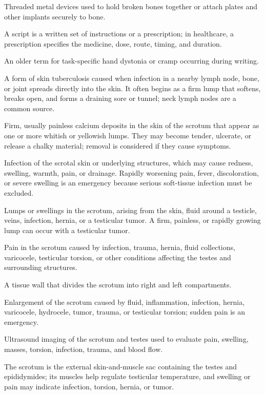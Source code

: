  Threaded metal devices used to hold broken bones together or attach plates and other implants securely to bone.

 A script is a written set of instructions or a prescription; in healthcare, a prescription specifies the medicine, dose, route, timing, and duration.

 An older term for task-specific hand dystonia or cramp occurring during writing.

 A form of skin tuberculosis caused when infection in a nearby lymph node, bone, or joint spreads directly into the skin. It often begins as a firm lump that softens, breaks open, and forms a draining sore or tunnel; neck lymph nodes are a common source.

 Firm, usually painless calcium deposits in the skin of the scrotum that appear as one or more whitish or yellowish lumps. They may become tender, ulcerate, or release a chalky material; removal is considered if they cause symptoms.

 Infection of the scrotal skin or underlying structures, which may cause redness, swelling, warmth, pain,
or drainage. Rapidly worsening pain, fever, discoloration, or severe swelling is an emergency
because serious soft-tissue infection must be excluded.

 Lumps or swellings in the scrotum, arising from the skin, fluid around a testicle, veins, infection, hernia, or a testicular tumor. A firm, painless, or rapidly growing lump can occur with a testicular tumor.

 Pain in the scrotum caused by infection, trauma, hernia, fluid collections, varicocele, testicular torsion, or other conditions affecting the testes and surrounding structures.

 A tissue wall that divides the scrotum into right and left compartments.

 Enlargement of the scrotum caused by fluid, inflammation, infection, hernia, varicocele, hydrocele, tumor, trauma, or testicular torsion; sudden pain is an emergency.

 Ultrasound imaging of the scrotum and testes used to evaluate pain, swelling, masses, torsion, infection, trauma, and blood flow.

 The scrotum is the external skin-and-muscle sac containing the testes and epididymides; its muscles help regulate testicular temperature, and swelling or pain may indicate infection, torsion, hernia, or tumor.


